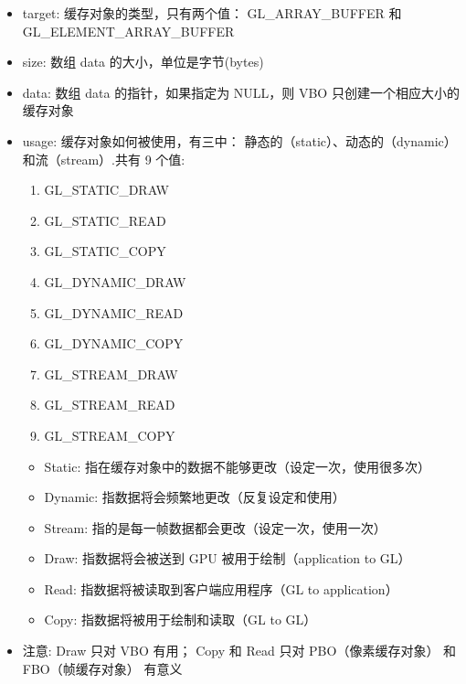 \documentclass[UTF8,a4paper,12pt]{ctexbook}
\begin{document}
				\begin{itemize}
					\item target: 缓存对象的类型，只有两个值： GL\_ARRAY\_BUFFER 和 GL\_ELEMENT\_ARRAY\_BUFFER
					
					\item size: 数组 data 的大小，单位是字节(bytes)
					\item data: 数组 data 的指针，如果指定为 NULL，则 VBO 只创建一个相应大小的缓存对象
					\item usage: 缓存对象如何被使用，有三中： 静态的（static）、动态的（dynamic）和流（stream）.共有 9 个值:
						\begin{enumerate}
							\item GL\_STATIC\_DRAW
							\item GL\_STATIC\_READ
							\item GL\_STATIC\_COPY
							\item GL\_DYNAMIC\_DRAW
							\item GL\_DYNAMIC\_READ
							\item GL\_DYNAMIC\_COPY
							\item GL\_STREAM\_DRAW
							\item GL\_STREAM\_READ
							\item GL\_STREAM\_COPY
						\end{enumerate}
						
						\begin{itemize}
							\item Static: 指在缓存对象中的数据不能够更改（设定一次，使用很多次）
							\item Dynamic: 指数据将会频繁地更改（反复设定和使用）
							\item Stream: 指的是每一帧数据都会更改（设定一次，使用一次）
						\end{itemize}
						
						\begin{itemize}
							\item Draw: 指数据将会被送到 GPU 被用于绘制（application to GL）
							\item Read: 指数据将被读取到客户端应用程序（GL to application）
							\item Copy: 指数据将被用于绘制和读取（GL to GL）
						\end{itemize}
					\item 注意: Draw 只对 VBO 有用； Copy 和 Read 只对 PBO（像素缓存对象） 和 FBO（帧缓存对象） 有意义
				\end{itemize}
			
\end{document}
